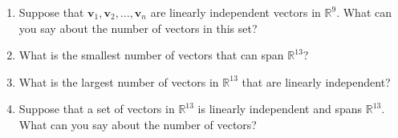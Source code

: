 \documentclass[12pt]{article}
\newcommand{\vs}[1]{\vspace{#1in}}
\newcommand{\vvec}{{\mathbf v}}
\newcommand{\real}{{\mathbb R}}
\begin{document}
\begin{enumerate}
\begin{enumerate}[label=(\alph*)]
    \vs{1}
  \item Suppose that $\vvec_1,\vvec_2,\ldots,\vvec_n$ are linearly
    independent vectors in $\real^9$.  What can you say about the
    number of vectors in this set?

    \vs{1}
  \item What is the smallest number of vectors that can span
    $\real^{13}$?

    \vs{1}
  \item What is the largest number of vectors in $\real^{13}$ that are
    linearly independent?

    \vs{1}
  \item Suppose that a set of vectors in $\real^{13}$ is linearly
    independent and spans $\real^{13}$.  What can you say about the
    number of vectors?

    \vs{1}
  \end{enumerate}
  

    

  

\end{enumerate}
\end{document}
